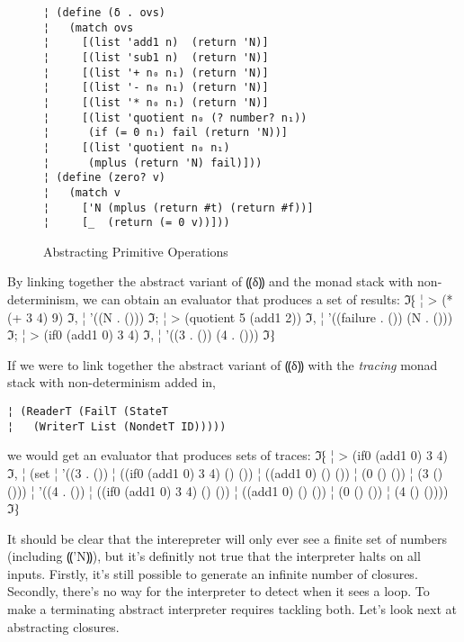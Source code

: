 \begin{figure} %
\begin{lstlisting}
¦ (define (δ . ovs)
¦   (match ovs
¦     [(list 'add1 n)  (return 'N)]
¦     [(list 'sub1 n)  (return 'N)]
¦     [(list '+ n₀ n₁) (return 'N)]
¦     [(list '- n₀ n₁) (return 'N)]
¦     [(list '* n₀ n₁) (return 'N)]
¦     [(list 'quotient n₀ (? number? n₁))
¦      (if (= 0 n₁) fail (return 'N))]
¦     [(list 'quotient n₀ n₁)
¦      (mplus (return 'N) fail)]))
¦ (define (zero? v)
¦   (match v
¦     ['N (mplus (return #t) (return #f))]
¦     [_  (return (= 0 v))]))
\end{lstlisting}
\caption{Abstracting Primitive Operations}
\label{f:abs-delta}
\end{figure} %

By linking together the abstract variant of ⸨δ⸩ and the monad stack with
non-determinism, we can obtain an evaluator that produces a set of results:
ℑ⁅
¦ > (* (+ 3 4) 9)
ℑ,
¦ '((N . ()))
ℑ;
¦ > (quotient 5 (add1 2))
ℑ,
¦ '((failure . ()) (N . ()))
ℑ;
¦ > (if0 (add1 0) 3 4)
ℑ,
¦ '((3 . ()) (4 . ()))
ℑ⁆

If we were to link together the abstract variant of ⸨δ⸩ with the \emph{tracing}
monad stack with non-determinism added in,
\begin{lstlisting}
¦ (ReaderT (FailT (StateT 
¦   (WriterT List (NondetT ID)))))
\end{lstlisting}
we would get an evaluator that produces sets of traces:
ℑ⁅
¦ > (if0 (add1 0) 3 4)
ℑ,
¦ (set
¦  '((3 . ())
¦    ((if0 (add1 0) 3 4) () ())
¦    ((add1 0) () ())
¦    (0 () ())
¦    (3 () ()))
¦  '((4 . ())
¦    ((if0 (add1 0) 3 4) () ())
¦    ((add1 0) () ())
¦    (0 () ())
¦    (4 () ())))
ℑ⁆

It should be clear that the interepreter will only ever see a finite set of
numbers (including ⸨'N⸩), but it's definitly not true that the interpreter
halts on all inputs.  Firstly, it's still possible to generate an infinite
number of closures.  Secondly, there's no way for the interpreter to detect
when it sees a loop.  To make a terminating abstract interpreter requires
tackling both.  Let's look next at abstracting closures.
